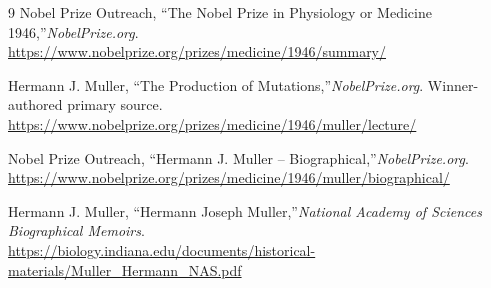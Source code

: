 \begin{thebibliography}{9}
Nobel Prize Outreach, ``The Nobel Prize in Physiology or Medicine 1946,''\emph{NobelPrize.org}.\\
\url{https://www.nobelprize.org/prizes/medicine/1946/summary/}

Hermann J. Muller, ``The Production of Mutations,''\emph{NobelPrize.org}. Winner-authored primary source.\\
\url{https://www.nobelprize.org/prizes/medicine/1946/muller/lecture/}

Nobel Prize Outreach, ``Hermann J. Muller -- Biographical,''\emph{NobelPrize.org}.\\
\url{https://www.nobelprize.org/prizes/medicine/1946/muller/biographical/}

Hermann J. Muller, ``Hermann Joseph Muller,''\emph{National Academy of Sciences Biographical Memoirs}.\\
\url{https://biology.indiana.edu/documents/historical-materials/Muller_Hermann_NAS.pdf}
\end{thebibliography}
